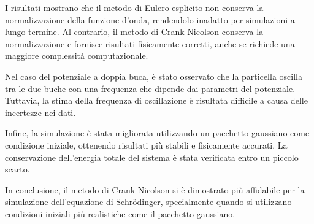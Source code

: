 \documentclass[a4paper, titlepage]{article}
\numberwithin{equation}{section}
\begin{document}
I risultati mostrano che il metodo di Eulero esplicito non conserva la normalizzazione della funzione d'onda, rendendolo inadatto per simulazioni a lungo termine. Al contrario, il metodo di Crank-Nicolson conserva la normalizzazione e fornisce risultati fisicamente corretti, anche se richiede una maggiore complessità computazionale.

Nel caso del potenziale a doppia buca, è stato osservato che la particella oscilla tra le due buche con una frequenza che dipende dai parametri del potenziale. Tuttavia, la stima della frequenza di oscillazione è risultata difficile a causa delle incertezze nei dati.

Infine, la simulazione è stata migliorata utilizzando un pacchetto gaussiano come condizione iniziale, ottenendo risultati più stabili e fisicamente accurati. La conservazione dell'energia totale del sistema è stata verificata entro un piccolo scarto.

In conclusione, il metodo di Crank-Nicolson si è dimostrato più affidabile per la simulazione dell'equazione di Schrödinger, specialmente quando si utilizzano condizioni iniziali più realistiche come il pacchetto gaussiano.



\pagebreak
\appendix
\end{document}
